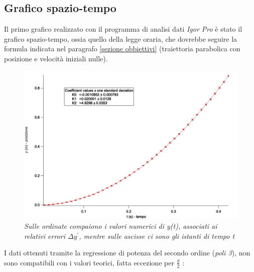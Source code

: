 \documentclass[12pt, a4paper]{article}
\begin{document}
\subsection{Grafico spazio-tempo} \label{Agg. misure xconcl}
Il primo grafico realizzato con il programma di analisi dati \textit{Igor Pro} è stato il grafico spazio-tempo, ossia quello della legge oraria, che dovrebbe seguire la formula indicata nel paragrafo \ref{sezione obbiettivi} (traiettoria parabolica con posizione e velocità iniziali nulle).\\ 

    \begin{figure}[h!]
\centering
\includegraphics[width=170mm]{Immagini/Graph4 non comp.jpg}
\caption{\textit{{\footnotesize{Sulle ordinate compaiono i valori numerici di \textit{y(t)}, associati ai relativi errori  \textit{$\Delta y^{'}$}, mentre sulle ascisse ci sono gli istanti di tempo \textit{t}}}}}
\label{Grafico parabolico}
\end{figure}


I dati ottenuti tramite la regressione di potenza del secondo ordine (\textit{poli 3}), non sono compatibili con i valori teorici, fatta eccezione per $\displaystyle{\frac{g}{2}}$ :
\end{document}
